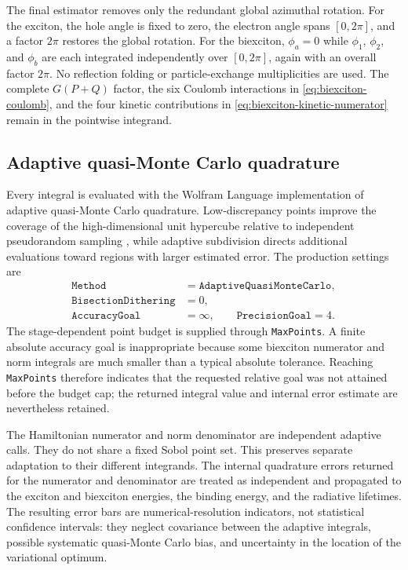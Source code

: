 The final estimator removes only the redundant global azimuthal rotation. For
the exciton, the hole angle is fixed to zero, the electron angle spans
$[0,2\pi]$, and a factor $2\pi$ restores the global rotation. For the
biexciton, $\phi_a=0$ while $\phi_1$, $\phi_2$, and $\phi_b$ are each
integrated independently over $[0,2\pi]$, again with an overall factor
$2\pi$. No reflection folding or particle-exchange multiplicities are used.
The complete $G(P+Q)$ factor, the six Coulomb interactions in
\cref{eq:biexciton-coulomb}, and the four kinetic contributions in
\cref{eq:biexciton-kinetic-numerator} remain in the pointwise integrand.

\subsection{Adaptive quasi-Monte Carlo quadrature}
\label{sec:quadrature}

Every integral is evaluated with the Wolfram Language implementation of
adaptive quasi-Monte Carlo quadrature. Low-discrepancy points improve the
coverage of the high-dimensional unit hypercube relative to independent
pseudorandom sampling \cite{caflisch1998}, while adaptive subdivision directs
additional evaluations toward regions with larger estimated error. The
production settings are
\begin{equation}
\begin{aligned}
 \texttt{Method}&=\texttt{AdaptiveQuasiMonteCarlo},\\
 \texttt{BisectionDithering}&=0,\\
 \texttt{AccuracyGoal}&=\infty,\qquad
 \texttt{PrecisionGoal}=4 .
\end{aligned}
\label{eq:qmc-settings}
\end{equation}
The stage-dependent point budget is supplied through
\texttt{MaxPoints}. A finite absolute accuracy goal is inappropriate because
some biexciton numerator and norm integrals are much smaller than a typical
absolute tolerance. Reaching \texttt{MaxPoints} therefore indicates that the
requested relative goal was not attained before the budget cap; the returned
integral value and internal error estimate are nevertheless retained.

The Hamiltonian numerator and norm denominator are independent adaptive calls.
They do not share a fixed Sobol point set. This preserves separate adaptation
to their different integrands. The internal quadrature errors returned for
the numerator and denominator are treated as independent and propagated to
the exciton and biexciton energies, the binding energy, and the radiative
lifetimes. The resulting error bars are numerical-resolution indicators, not
statistical confidence intervals: they neglect covariance between the
adaptive integrals, possible systematic quasi-Monte Carlo bias, and uncertainty
in the location of the variational optimum.

